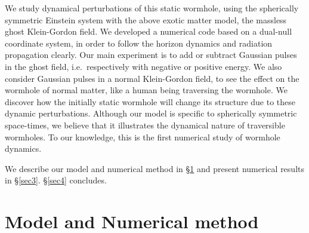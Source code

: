 \documentclass[aps,showpacs,twocolumn,draft,eqsecnum]{revtex4}
\begin{document}
We study dynamical perturbations of this static wormhole, using the spherically
symmetric Einstein system with the above exotic matter model, the massless
ghost Klein-Gordon field. We developed a numerical code based on a dual-null
coordinate system, in order to follow the horizon dynamics and radiation
propagation clearly. Our main experiment is to add or subtract Gaussian pulses
in the ghost field, i.e.\ respectively with negative or positive energy. We
also consider Gaussian pulses in a normal Klein-Gordon field, to see the effect
on the wormhole of normal matter, like a human being traversing the wormhole.
We discover how the initially static wormhole will change its structure due to
these dynamic perturbations. Although our model is specific to spherically
symmetric space-times, we believe that it illustrates the dynamical nature of
traversible wormholes. To our knowledge, this is the first numerical study of
wormhole dynamics.

We describe our model and numerical method in \S \ref{sec2} and present
numerical results in \S \ref{sec3}.  \S \ref{sec4} concludes.

\section{Model and Numerical method}\label{sec2}

\end{document}

